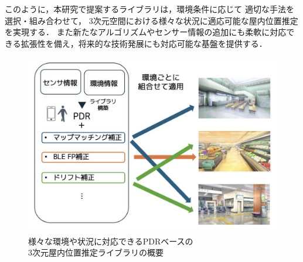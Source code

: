 このように，本研究で提案するライブラリは，環境条件に応じて
適切な手法を選択・組み合わせて，
3次元空間における様々な状況に適応可能な屋内位置推定を実現する．
また新たなアルゴリズムやセンサー情報の追加にも柔軟に対応できる拡張性を備え，将来的な技術発展にも対応可能な基盤を提供する．

\begin{figure}[h]
	\centering
	\includegraphics[width=\linewidth]{../image/first.pdf}
	\caption{様々な環境や状況に対応できるPDRベースの\\3次元屋内位置推定ライブラリの概要}    \label{fig:overview}
\end{figure}
